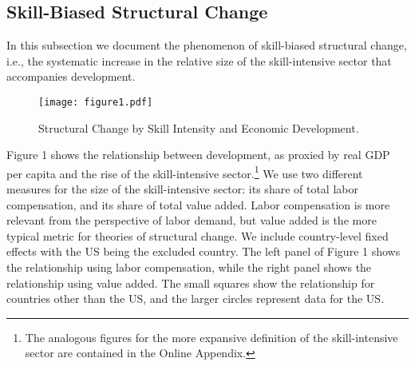 \documentclass[12pt,english]{article}
\begin{document}
\subsection{Skill-Biased Structural Change}

In this subsection we document the phenomenon of skill-biased structural
change, i.e., the systematic increase in the relative size of the
skill-intensive sector that accompanies development.

\begin{figure}[!hbt]
\caption{ Structural Change by Skill Intensity and Economic Development.}
\label{fig_1}
\smallskip \centering
\begin{minipage}{0.85\textwidth}
\texttt{[image: figure1.pdf]}
\end{minipage}
\end{figure}

Figure 1 shows the relationship between development, as proxied by real GDP
per capita and the rise of the skill-intensive sector.\footnote{%
The analogous figures for the more expansive definition of the
skill-intensive sector are contained in the Online Appendix.} We use two
different measures for the size of the skill-intensive sector: its share of
total labor compensation, and its share of total value added. Labor
compensation is more relevant from the perspective of labor demand, but
value added is the more typical metric for theories of structural change. We
include country-level fixed effects with the US being the excluded country.
The left panel of Figure 1 shows the relationship using labor compensation,
while the right panel shows the relationship using value added. The small
squares show the relationship for countries other than the US, and the
larger circles represent data for the US.
\end{document}
